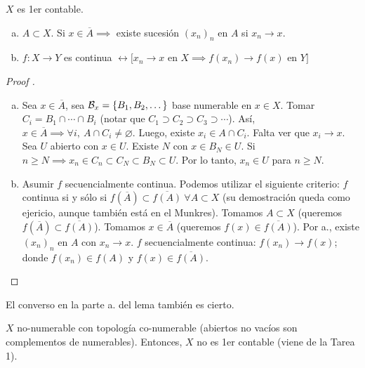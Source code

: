 \begin{lemma}
	$X$ es 1er contable.
	\begin{enumerate}[a)]
		\item $A \subset X$. Si $x \in \overline{A} \implies$ existe sucesión $(x_{n})_{n}$ en $A$ si $x_{n} \longrightarrow x$.

		\item $f : X \to Y$ es continua $\leftrightarrow \big[ x_{n} \longrightarrow x \text{ en } X \implies f(x_{n}) \longrightarrow f(x) \text{ en } Y \big]$
	\end{enumerate}
\end{lemma}
\begin{proof}[Proof ]
	\begin{enumerate}[a)]
		\item Sea $x \in \overline{A}$, sea $\mathcal{B}_{x} = \{B_{1},B_{2},\dots\}$ base numerable en $x \in X$. Tomar $C_{i} = B_{1} \cap \cdots \cap B_{i}$ (notar que $C_{1} \supset C_{2} \supset C_{3} \supset \cdots$). Así, $x \in \overline{A} \implies \forall i,\ A \cap C_{i} \neq \varnothing$. Luego, existe $x_{i} \in A \cap C_{i}$. Falta ver que $x_{i} \longrightarrow x$. Sea $U$ abierto con $x \in U$. Existe $N$ con $x \in B_{N} \in U$. Si $n \geq N \implies x_{n} \in C_{n} \subset C_{N} \subset B_{N} \subset U$. Por lo tanto, $x_{n} \in U$ para $n \geq N$.

		\item Asumir $f$ secuencialmente continua. Podemos utilizar el siguiente criterio: $f$ continua si y sólo si $f(\overline{A}) \subset \overline{f(A)} \ \forall A \subset X$ (su demostración queda como ejericio, aunque también está en el Munkres). Tomamos $A \subset X$ (queremos $f(\overline{A}) \subset \overline{f(A)}$). Tomamos $x \in \overline{A}$ (queremos $f(x) \in \overline{f(A)}$). Por a., existe $(x_{n})_{n}$ en $A$ con $x_{n} \longrightarrow x$. $f$ secuencialmente continua: $f(x_{n}) \longrightarrow f(x)$; donde $f(x_{n}) \in f(A)$ y $f(x) \in \overline{f(A)}$.
	\end{enumerate}
\end{proof}

\begin{remark}
	El converso en la parte a. del lema también es cierto.
\end{remark}

\begin{corollary}
	$X$ no-numerable con topología co-numerable (abiertos no vacíos  son complementos de numerables). Entonces, $X$ no es 1er contable (viene de la Tarea 1).
\end{corollary}

